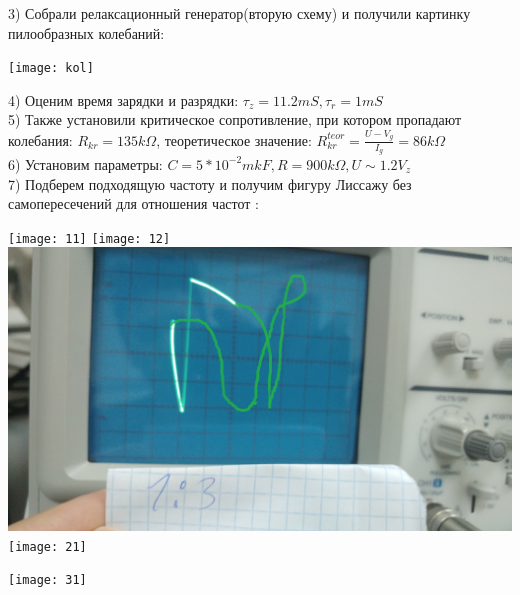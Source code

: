 \documentclass[a4paper,12pt]{article} %
\begin{document}
3) Собрали релаксационный генератор(вторую схему) и получили картинку пилообразных колебаний: \\
\begin{center}

\texttt{[image: kol]}\\
\end{center}

4) Оценим время зарядки и разрядки: $\tau_z=11.2 mS, \tau_r=1 mS$\\
5) Также установили критическое сопротивление, при котором пропадают колебания: $R_{kr}=135 k\Omega$, теоретическое значение: $R_{kr}^{teor}=\frac{U-V_g}{I_g}=86k\Omega$\\



6) Установим параметры: $ C=5*10^{-2}  mkF, R=900 k\Omega,  U\sim1.2V_z $\\
7) Подберем подходящую частоту и получим фигуру Лиссажу без самопересечений для отношения частот :

\texttt{[image: 11]}
\texttt{[image: 12]}
\includegraphics[scale=0.05]{13}
\texttt{[image: 21]}
\begin{center}

\texttt{[image: 31]}

\end{center}
\end{document}
